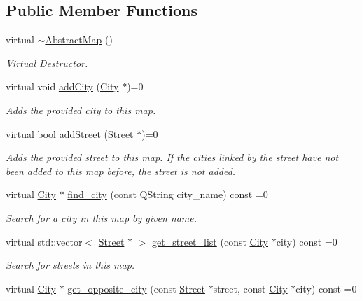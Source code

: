 \subsection*{Public Member Functions}
\begin{DoxyCompactItemize}
\item 
\mbox{\label{class_abstract_map_ab2fbb46108e2905fb1193a67510d41f0}} 
virtual \hyperlink{class_abstract_map_ab2fbb46108e2905fb1193a67510d41f0}{$\sim$\+Abstract\+Map} ()
\begin{DoxyCompactList}\small\item\em Virtual Destructor. \end{DoxyCompactList}\item 
virtual void \hyperlink{class_abstract_map_a9938512c5ef94370786a3d1a72aa7e37}{add\+City} (\hyperlink{class_city}{City} $\ast$)=0
\begin{DoxyCompactList}\small\item\em Adds the provided city to this map. \end{DoxyCompactList}\item 
virtual bool \hyperlink{class_abstract_map_a179d25c28087d9090314caff024b1f46}{add\+Street} (\hyperlink{class_street}{Street} $\ast$)=0
\begin{DoxyCompactList}\small\item\em Adds the provided street to this map. If the cities linked by the street have not been added to this map before, the street is not added. \end{DoxyCompactList}\item 
virtual \hyperlink{class_city}{City} $\ast$ \hyperlink{class_abstract_map_abda0a780cdd294491b1dff5c088b96a2}{find\+\_\+city} (const Q\+String city\+\_\+name) const =0
\begin{DoxyCompactList}\small\item\em Search for a city in this map by given name. \end{DoxyCompactList}\item 
virtual std\+::vector$<$ \hyperlink{class_street}{Street} $\ast$ $>$ \hyperlink{class_abstract_map_a228d43b47211f3836fdc66760831d61d}{get\+\_\+street\+\_\+list} (const \hyperlink{class_city}{City} $\ast$city) const =0
\begin{DoxyCompactList}\small\item\em Search for streets in this map. \end{DoxyCompactList}\item 
virtual \hyperlink{class_city}{City} $\ast$ \hyperlink{class_abstract_map_ab372998d6ab42b67d1fd7b97b2c380f2}{get\+\_\+opposite\+\_\+city} (const \hyperlink{class_street}{Street} $\ast$street, const \hyperlink{class_city}{City} $\ast$city) const =0

\end{DoxyCompactItemize}
